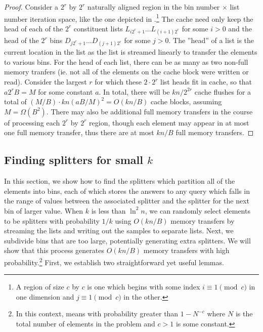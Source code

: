 \begin{proof}
Consider a $2^r$ by $2^r$ naturally aligned region in the bin number $\times$ list
number iteration space, like the one depicted in 
.\footnote{A  region
of size $c$ by $c$ is one which begins with some index $i \equiv 1 \pmod{c}$ 
in one dimension and $j \equiv 1 \pmod{c}$ in the other.}  
The cache need only keep the head of each of the $2^r$ constituent
lists $L_{i2^r + 1} \ldots L_{(i+1)2^r}$ for some $i>0$ and the head of the $2^r$ bins 
$D_{j2^r + 1} \ldots D_{(j+1)2^r}$ for some $j>0$. 
The ''head'' of a list is the current location
in the list as the list is streamed linearly to transfer the elements to various bins.  
For the head of each list, there can be as many as
two non-full memory tranfers (ie. not all of the elements on the cache block were
written or read).  Consider the largest $r$ for which these $2 \cdot 2^r$ list heads
fit in cache, so that $a2^r B = M$ for some constant $a$.  In total, there will be 
$kn/2^{2r}$ cache flushes for a total of $(M/B) \cdot kn(aB/M)^2 = O(kn/B)$ cache blocks, 
assuming $M = \Omega(B^2)$.  There may also be additional full memory transfers in the
course of processing each $2^r$ by $2^r$ region, though
each element may appear in at most one full memory transfer, thus there are at most
$kn/B$ full memory transfers.  
\end{proof}

\subsection*{Finding splitters for small $k$}

In this section, we show how to find the splitters
which partition all of the elements into bins, each of which stores the answers to any
query which falls in the range of values between the associated splitter and the
splitter for the next bin of larger value.
When $k$ is less than $\ln^2 n$, we can randomly select elements to be splitters
with probability $1/k$ using $O(kn/B)$ memory transfers by streaming the lists and
writing out the samples to separate lists.  Next, 
we subdivide bins that are too large, potentially generating
extra splitters.  We will show that this process generates $O(kn/B)$ memory 
transfers with high probability.\footnote{In this context, 
 means with probability greater
than $1-N^{-c}$ where $N$ is the total number of elements in the problem and $c > 1$
is some constant.} First, we establish two straightforward yet useful lemmas.

